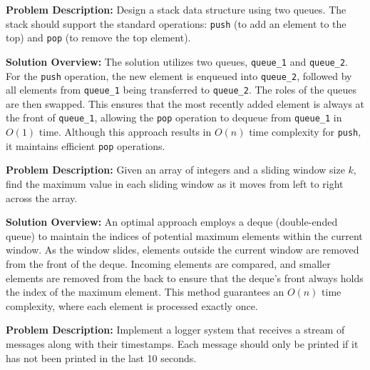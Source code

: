 
\textbf{Problem Description:}  
Design a stack data structure using two queues. The stack should support the standard operations: \texttt{push} (to add an element to the top) and \texttt{pop} (to remove the top element).

\textbf{Solution Overview:}  
The solution utilizes two queues, \texttt{queue\_1} and \texttt{queue\_2}. For the \texttt{push} operation, the new element is enqueued into \texttt{queue\_2}, followed by all elements from \texttt{queue\_1} being transferred to \texttt{queue\_2}. The roles of the queues are then swapped. This ensures that the most recently added element is always at the front of \texttt{queue\_1}, allowing the \texttt{pop} operation to dequeue from \texttt{queue\_1} in \(O(1)\) time. Although this approach results in \(O(n)\) time complexity for \texttt{push}, it maintains efficient \texttt{pop} operations.


\textbf{Problem Description:}  
Given an array of integers and a sliding window size \(k\), find the maximum value in each sliding window as it moves from left to right across the array.

\textbf{Solution Overview:}  
An optimal approach employs a deque (double-ended queue) to maintain the indices of potential maximum elements within the current window. As the window slides, elements outside the current window are removed from the front of the deque. Incoming elements are compared, and smaller elements are removed from the back to ensure that the deque's front always holds the index of the maximum element. This method guarantees an \(O(n)\) time complexity, where each element is processed exactly once.


\textbf{Problem Description:}  
Implement a logger system that receives a stream of messages along with their timestamps. Each message should only be printed if it has not been printed in the last 10 seconds.

